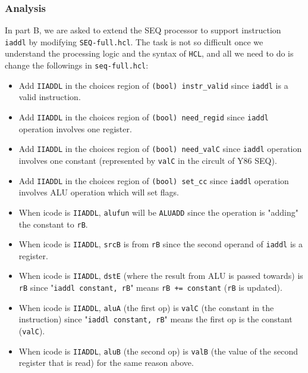 \documentclass{article}
\begin{document}
\subsubsection{Analysis}
In part B, we are asked to extend the SEQ processor to support instruction \texttt{iaddl} by modifying \texttt{SEQ-full.hcl}.
The task is not so difficult once we understand the processing logic and the syntax of \texttt{HCL}, and all we need to do is change the followings in \texttt{seq-full.hcl}:
\begin{itemize}
        \item Add \texttt{IIADDL} in the choices region of \texttt{(bool) instr\_valid} since \texttt{iaddl} is a valid instruction.
        \item Add \texttt{IIADDL} in the choices region of \texttt{(bool) need\_regid} since \texttt{iaddl} operation involves one register.
        \item Add \texttt{IIADDL} in the choices region of \texttt{(bool) need\_valC} since \texttt{iaddl} operation involves one constant (represented by \texttt{valC} in the circult of Y86 SEQ).
        \item Add \texttt{IIADDL} in the choices region of \texttt{(bool) set\_cc} since \texttt{iaddl} operation involves ALU operation which will set flags.
        \item When icode is \texttt{IIADDL}, \texttt{alufun} will be \texttt{ALUADD} since the operation is "adding" the constant to \texttt{rB}.
        \item When icode is \texttt{IIADDL}, \texttt{srcB} is from \texttt{rB} since the second operand of \texttt{iaddl} is a register.
        \item When icode is \texttt{IIADDL}, \texttt{dstE} (where the result from ALU is passed towards) is \texttt{rB} since "\texttt{iaddl constant, rB}" means \texttt{rB += constant} (\texttt{rB} is updated). 
        \item When icode is \texttt{IIADDL}, \texttt{aluA} (the first op) is \texttt{valC} (the constant in the instruction) since "\texttt{iaddl constant, rB}" means the first op is the constant (\texttt{valC}).
        \item When icode is \texttt{IIADDL}, \texttt{aluB} (the second op) is \texttt{valB} (the value of the second register that is read) for the same reason above.
\end{itemize}
\end{document}
